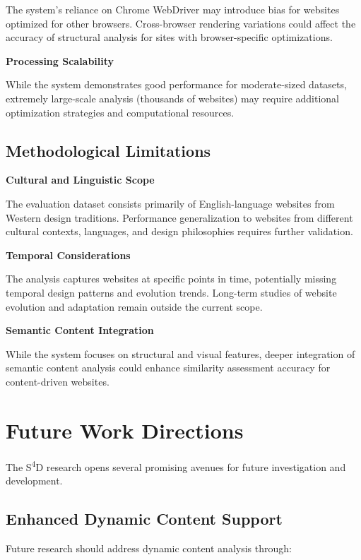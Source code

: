 The system's reliance on Chrome WebDriver may introduce bias for websites optimized for other browsers. Cross-browser rendering variations could affect the accuracy of structural analysis for sites with browser-specific optimizations.

\textbf{Processing Scalability}

While the system demonstrates good performance for moderate-sized datasets, extremely large-scale analysis (thousands of websites) may require additional optimization strategies and computational resources.

\subsection{Methodological Limitations}
\label{subsec:methodological-limitations}

\textbf{Cultural and Linguistic Scope}

The evaluation dataset consists primarily of English-language websites from Western design traditions. Performance generalization to websites from different cultural contexts, languages, and design philosophies requires further validation.

\textbf{Temporal Considerations}

The analysis captures websites at specific points in time, potentially missing temporal design patterns and evolution trends. Long-term studies of website evolution and adaptation remain outside the current scope.

\textbf{Semantic Content Integration}

While the system focuses on structural and visual features, deeper integration of semantic content analysis could enhance similarity assessment accuracy for content-driven websites.

\section{Future Work Directions}
\label{sec:future-work}

The S\textsuperscript{4}D research opens several promising avenues for future investigation and development.

\subsection{Enhanced Dynamic Content Support}
\label{subsec:enhanced-dynamic}

Future research should address dynamic content analysis through:

